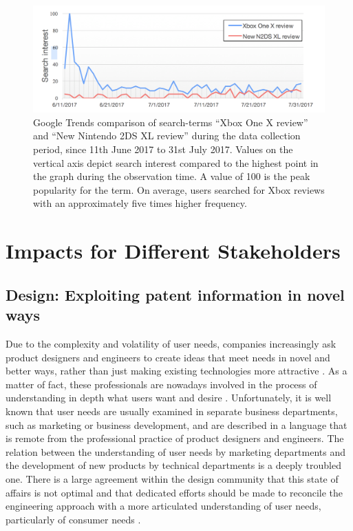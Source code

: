 \documentclass[]{book}
\begin{document}
\begin{figure}

{\centering \includegraphics[width=1\linewidth]{_bookdown_files/figures/tweet_search_interest} 

}

\caption{Google Trends comparison of search-terms “Xbox One X review” and “New Nintendo 2DS XL review” during the data collection period, since 11th June 2017 to 31st July 2017. Values on the vertical axis depict search interest compared to the highest point in the graph during the observation time. A value of 100 is the peak popularity for the term. On average, users searched for Xbox reviews with an approximately five times higher frequency.}\label{fig:tweetsearchinterest}
\end{figure}

\part{Impacts for Different
Stakeholders}\label{part-impacts-for-different-stakeholders}

\chapter{Design: Exploiting patent information in novel
ways}\label{design-exploiting-patent-information-in-novel-ways}

Due to the complexity and volatility of user needs, companies
increasingly ask product designers and engineers to create ideas that
meet needs in novel and better ways, rather than just making existing
technologies more attractive \citep{brown2010design}. As a matter of
fact, these professionals are nowadays involved in the process of
understanding in depth what users want and desire
\citep{haley1968benefit, day1979customer}. Unfortunately, it is well
known that user needs are usually examined in separate business
departments, such as marketing or business development, and are
described in a language that is remote from the professional practice of
product designers and engineers. The relation between the understanding
of user needs by marketing departments and the development of new
products by technical departments is a deeply troubled one. There is a
large agreement within the design community that this state of affairs
is not optimal and that dedicated efforts should be made to reconcile
the engineering approach with a more articulated understanding of user
needs, particularly of consumer needs
\citep{pahl2013engineering, eppinger1995product}.
\end{document}

